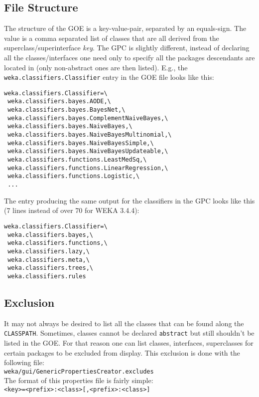\subsection{File Structure}
The structure of the GOE is a key-value-pair, separated by an
equals-sign. The value is a comma separated list of classes that are
all derived from the superclass/superinterface \textit{key}. The GPC is
slightly different, instead of declaring all the classes/interfaces
one need only to specify all the packages descendants are located in
(only non-abstract ones are then listed). E.g., the
\verb=weka.classifiers.Classifier= entry in the GOE file looks like this:
\begin{verbatim}
weka.classifiers.Classifier=\
 weka.classifiers.bayes.AODE,\
 weka.classifiers.bayes.BayesNet,\
 weka.classifiers.bayes.ComplementNaiveBayes,\
 weka.classifiers.bayes.NaiveBayes,\
 weka.classifiers.bayes.NaiveBayesMultinomial,\
 weka.classifiers.bayes.NaiveBayesSimple,\
 weka.classifiers.bayes.NaiveBayesUpdateable,\
 weka.classifiers.functions.LeastMedSq,\
 weka.classifiers.functions.LinearRegression,\
 weka.classifiers.functions.Logistic,\
 ...
\end{verbatim}
The entry producing the same output for the classifiers in the GPC
looks like this (7 lines instead of over 70 for WEKA 3.4.4):
\begin{verbatim}
weka.classifiers.Classifier=\
 weka.classifiers.bayes,\
 weka.classifiers.functions,\
 weka.classifiers.lazy,\
 weka.classifiers.meta,\
 weka.classifiers.trees,\
 weka.classifiers.rules
\end{verbatim}

\subsection{Exclusion}
It may not always be desired to list all the classes that can be found
along the \verb=CLASSPATH=. Sometimes, classes cannot be declared \verb=abstract=
but still shouldn't be listed in the GOE. For that reason one can list
classes, interfaces, superclasses for certain packages to be excluded
from display. This exclusion is done with the following file:\\

\verb=weka/gui/GenericPropertiesCreator.excludes=\\

\noindent The format of this properties file is fairly simple:\\

\verb^<key>=<prefix>:<class>[,<prefix>:<class>]^\\


